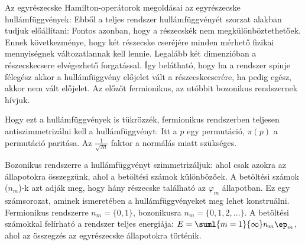    Az egyrészecske Hamilton-operátorok megoldásai az egyrészecske hullámfüggvények: 
   Ebből a teljes rendszer hullámfüggvényét szorzat alakban tudjuk előállítani:
   Fontos azonban, hogy a részecskék nem megkülönböztethetőek.
   Ennek következménye, hogy két részecske cseréjére minden mérhető fizikai mennyiségnek változatlannak kell lennie.
   Legalább két dimenzióban a részecskecsere elvégezhető forgatással. Így belátható, hogy ha a rendszer spinje félegész akkor a hullámfüggvény előjelet vált a részecskecserére, ha pedig egész, akkor nem vált előjelet.
   Az előzőt fermionikus, az utóbbit bozonikus rendszernek hívjuk. 
   
   Hogy ezt a hullámfüggvények is tükrözzék, fermionikus rendszerben teljesen antiszimmetrizálni kell a hullámfüggvényt:
   Itt a $p$ egy permutáció, $\pi(p)$ a permutáció paritása.
   Az $\frac{1}{\sqrt{N!}}$ faktor a normálás miatt szükséges.
   
   Bozonikus rendszerre a hullámfüggvényt szimmetrizáljuk:
   ahol csak azokra az állapotokra összegzünk, ahol a betöltési számok különbözőek.
   A betöltési számok ($n_m$)-k azt adják meg, hogy hány részecske található az $\varphi_m$ állapotban.
   Ez egy számsorozat, aminek ismeretében a hullámfüggvényeket meg lehet konstruálni.
   Fermionikus rendszerre $n_m=\{0,1\}$, bozonikusra $n_m=\{0,1,2,\dots\}$.
   A betöltési számokkal felírható a rendszer teljes energiája: $E=\suml{m=1}{\infty}n_m\ep_m$, ahol az összegzés az egyrészecske állapotokra történik.
   
